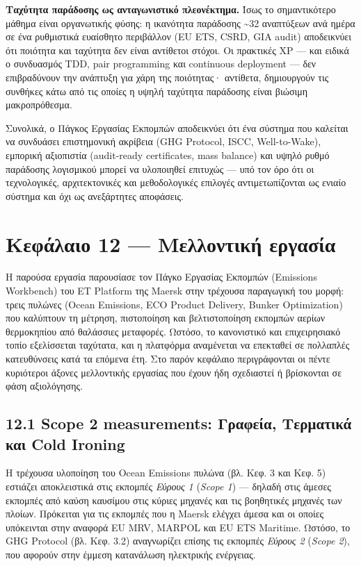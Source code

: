 \textbf{Ταχύτητα παράδοσης ως ανταγωνιστικό πλεονέκτημα.} Ίσως το
σημαντικότερο μάθημα είναι οργανωτικής φύσης: η ικανότητα παράδοσης
\textasciitilde32 αναπτύξεων ανά ημέρα σε ένα ρυθμιστικά ευαίσθητο
περιβάλλον (EU ETS, CSRD, GIA audit) αποδεικνύει ότι ποιότητα και
ταχύτητα δεν είναι αντίθετοι στόχοι. Οι πρακτικές XP --- και ειδικά ο
συνδυασμός TDD, pair programming και continuous deployment --- δεν
επιβραδύνουν την ανάπτυξη για χάρη της ποιότητας· αντίθετα, δημιουργούν
τις συνθήκες κάτω από τις οποίες η υψηλή ταχύτητα παράδοσης είναι
βιώσιμη μακροπρόθεσμα.

Συνολικά, ο Πάγκος Εργασίας Εκπομπών αποδεικνύει ότι ένα σύστημα που
καλείται να συνδυάσει επιστημονική ακρίβεια (GHG Protocol, ISCC,
Well-to-Wake), εμπορική αξιοπιστία (audit-ready certificates, mass
balance) και υψηλό ρυθμό παράδοσης λογισμικού μπορεί να υλοποιηθεί
επιτυχώς --- υπό τον όρο ότι οι τεχνολογικές, αρχιτεκτονικές και
μεθοδολογικές επιλογές αντιμετωπίζονται ως ενιαίο σύστημα και όχι ως
ανεξάρτητες αποφάσεις.

\pagebreak

\chapter{Κεφάλαιο 12 --- Μελλοντική
εργασία}\label{ux3baux3b5ux3c6ux3acux3bbux3b1ux3b9ux3bf-12-ux3bcux3b5ux3bbux3bbux3bfux3bdux3c4ux3b9ux3baux3ae-ux3b5ux3c1ux3b3ux3b1ux3c3ux3afux3b1}

Η παρούσα εργασία παρουσίασε τον Πάγκο Εργασίας Εκπομπών (Emissions
Workbench) του ET Platform της Maersk στην τρέχουσα παραγωγική του
μορφή: τρεις πυλώνες (Ocean Emissions, ECO Product Delivery, Bunker
Optimization) που καλύπτουν τη μέτρηση, πιστοποίηση και βελτιστοποίηση
εκπομπών αερίων θερμοκηπίου από θαλάσσιες μεταφορές. Ωστόσο, το
κανονιστικό και επιχειρησιακό τοπίο εξελίσσεται ταχύτατα, και η
πλατφόρμα αναμένεται να επεκταθεί σε πολλαπλές κατευθύνσεις κατά τα
επόμενα έτη. Στο παρόν κεφάλαιο περιγράφονται οι πέντε κυριότεροι άξονες
μελλοντικής εργασίας που έχουν ήδη σχεδιαστεί ή βρίσκονται σε φάση
αξιολόγησης.

\section{12.1 Scope 2 measurements: Γραφεία, Τερματικά και Cold
Ironing}\label{scope-2-measurements-ux3b3ux3c1ux3b1ux3c6ux3b5ux3afux3b1-ux3c4ux3b5ux3c1ux3bcux3b1ux3c4ux3b9ux3baux3ac-ux3baux3b1ux3b9-cold-ironing}

Η τρέχουσα υλοποίηση του Ocean Emissions πυλώνα (βλ. Κεφ. 3 και Κεφ. 5)
εστιάζει αποκλειστικά στις εκπομπές \emph{Εύρους 1} (\emph{Scope 1}) ---
δηλαδή στις άμεσες εκπομπές από καύση καυσίμου στις κύριες μηχανές και
τις βοηθητικές μηχανές των πλοίων. Πρόκειται για τις εκπομπές που η
Maersk ελέγχει άμεσα και οι οποίες υπόκεινται στην αναφορά EU MRV,
MARPOL και EU ETS Maritime. Ωστόσο, το GHG Protocol (βλ. Κεφ. 3.2)
αναγνωρίζει επίσης τις εκπομπές \emph{Εύρους 2} (\emph{Scope 2}), που
αφορούν στην έμμεση κατανάλωση ηλεκτρικής ενέργειας.

